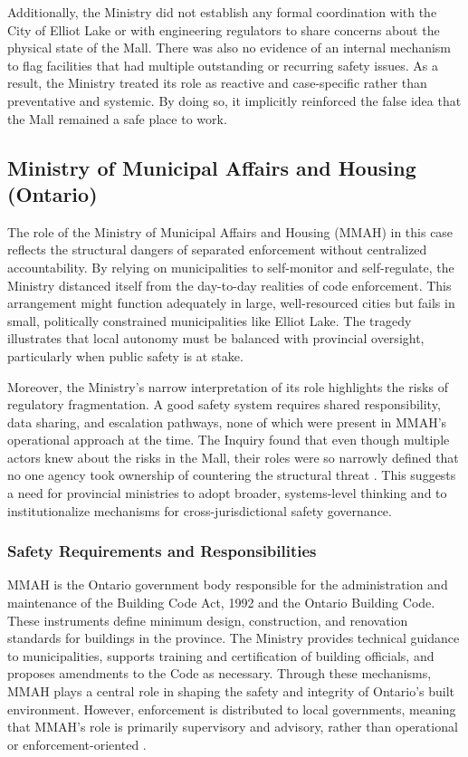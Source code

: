 \documentclass[12pt]{article}
\begin{document}
Additionally, the Ministry did not establish any formal coordination with the City of Elliot Lake or with engineering regulators to share concerns about the physical state of the Mall. There was also no evidence of an internal mechanism to flag facilities that had multiple outstanding or recurring safety issues. As a result, the Ministry treated its role as reactive and case-specific rather than preventative and systemic. By doing so, it implicitly reinforced the false idea that the Mall remained a safe place to work.

\subsection{Ministry of Municipal Affairs and Housing (Ontario)}

The role of the Ministry of Municipal Affairs and Housing (MMAH) in this case reflects the structural dangers of separated enforcement without centralized accountability. By relying on municipalities to self-monitor and self-regulate, the Ministry distanced itself from the day-to-day realities of code enforcement. This arrangement might function adequately in large, well-resourced cities but fails in small, politically constrained municipalities like Elliot Lake. The tragedy illustrates that local autonomy must be balanced with provincial oversight, particularly when public safety is at stake.

Moreover, the Ministry's narrow interpretation of its role highlights the risks of regulatory fragmentation. A good safety system requires shared responsibility, data sharing, and escalation pathways, none of which were present in MMAH's operational approach at the time. The Inquiry found that even though multiple actors knew about the risks in the Mall, their roles were so narrowly defined that no one agency took ownership of countering the structural threat \cite[p405-407]{AlgoLakeReport1}. This suggests a need for provincial ministries to adopt broader, systems-level thinking and to institutionalize mechanisms for cross-jurisdictional safety governance.

\subsubsection*{Safety Requirements and Responsibilities}

MMAH is the Ontario government body responsible for the administration and maintenance of the Building Code Act, 1992 and the Ontario Building Code. These instruments define minimum design, construction, and renovation standards for buildings in the province. The Ministry provides technical guidance to municipalities, supports training and certification of building officials, and proposes amendments to the Code as necessary. Through these mechanisms, MMAH plays a central role in shaping the safety and integrity of Ontario's built environment. However, enforcement is distributed to local governments, meaning that MMAH's role is primarily supervisory and advisory, rather than operational or enforcement-oriented \cite[p2-3, p405-406]{AlgoLakeReport1}.
\end{document}
